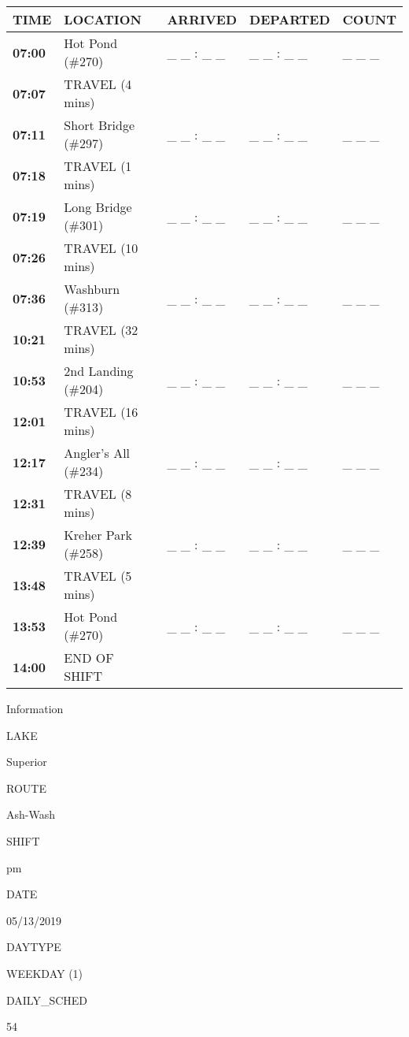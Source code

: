 \documentclass[]{article}
\begin{document}
\begin{tabular}{>{\bfseries}lllll}
\toprule
\textbf{TIME} & \textbf{LOCATION} & \textbf{ARRIVED} & \textbf{DEPARTED} & \textbf{COUNT}\\
\midrule
07:00 & Hot Pond (\#270) & \_ \_ : \_ \_ & \_ \_ : \_ \_ & \_ \_ \_\\
07:07 & TRAVEL (4 mins) &  &  & \\
07:11 & Short Bridge (\#297) & \_ \_ : \_ \_ & \_ \_ : \_ \_ & \_ \_ \_\\
07:18 & TRAVEL (1 mins) &  &  & \\
07:19 & Long Bridge (\#301) & \_ \_ : \_ \_ & \_ \_ : \_ \_ & \_ \_ \_\\
07:26 & TRAVEL (10 mins) &  &  & \\
07:36 & Washburn (\#313) & \_ \_ : \_ \_ & \_ \_ : \_ \_ & \_ \_ \_\\
10:21 & TRAVEL (32 mins) &  &  & \\
10:53 & 2nd Landing (\#204) & \_ \_ : \_ \_ & \_ \_ : \_ \_ & \_ \_ \_\\
12:01 & TRAVEL (16 mins) &  &  & \\
12:17 & Angler's All (\#234) & \_ \_ : \_ \_ & \_ \_ : \_ \_ & \_ \_ \_\\
12:31 & TRAVEL (8 mins) &  &  & \\
12:39 & Kreher Park (\#258) & \_ \_ : \_ \_ & \_ \_ : \_ \_ & \_ \_ \_\\
13:48 & TRAVEL (5 mins) &  &  & \\
13:53 & Hot Pond (\#270) & \_ \_ : \_ \_ & \_ \_ : \_ \_ & \_ \_ \_\\
14:00 & END OF SHIFT &  &  & \\
\bottomrule
\end{tabular}\newpage

Information

LAKE

Superior

ROUTE

Ash-Wash

SHIFT

pm

DATE

05/13/2019

DAYTYPE

WEEKDAY (1)

DAILY\_SCHED

54

\vspace{24pt}
\end{document}
